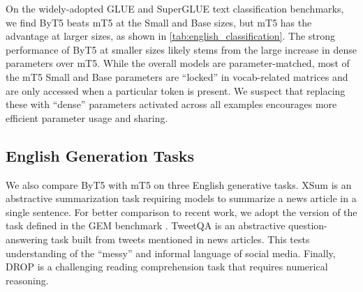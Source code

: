 \documentclass[11pt,a4paper]{article}
\begin{document}
On the widely-adopted GLUE \cite{wang2019glue} and SuperGLUE \cite{wang2019superglue} text classification benchmarks, we find ByT5 beats mT5 at the Small and Base sizes, but mT5 has the advantage at larger sizes, as shown in \cref{tab:english_classification}. The strong performance of ByT5 at smaller sizes likely stems from the large increase in dense parameters over mT5. While the overall models are parameter-matched, most of the mT5 Small and Base parameters are ``locked'' in vocab-related matrices and are only accessed when a particular token is present. We suspect that replacing these with ``dense'' parameters activated across all examples encourages more efficient parameter usage and sharing.

\subsection{English Generation Tasks}

We also compare ByT5 with mT5 on three English generative tasks. XSum \cite{narayan-etal-2018-dont} is an abstractive summarization task requiring models to summarize a news article in a single sentence. For better comparison to recent work, we adopt the version of the task defined in the GEM benchmark \cite{gehrmann2021gem}. TweetQA \cite{xiong-etal-2019-tweetqa} is an abstractive question-answering task built from tweets mentioned in news articles. This tests understanding of the ``messy'' and informal language of social media. Finally, DROP \cite{dua-etal-2019-drop} is a challenging reading comprehension task that requires numerical reasoning.

\begin{table}[t!]
\centering
{}
\caption{mT5 vs.~ByT5 on three English generation tasks, reporting the best score on the validation set.}
\label{tab:english_generation}
\end{table}
\end{document}

